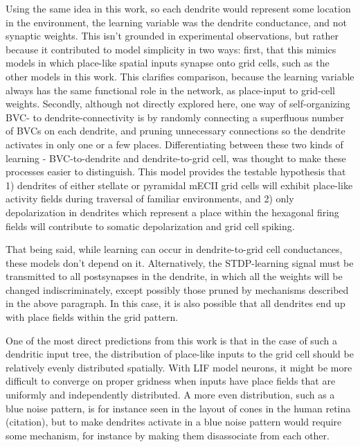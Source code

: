 \documentclass{article}
\begin{document}
    Using the same idea in this work, so each dendrite would represent some location in the environment, the learning variable was the dendrite conductance, and not synaptic weights. This isn't grounded in experimental observations, but rather because it contributed to model simplicity in two ways: first, that this mimics models in which place-like spatial inputs synapse onto grid cells, such as the other models in this work. This clarifies comparison, because the learning variable always has the same functional role in the network, as place-input to grid-cell weights. Secondly, although not directly explored here, one way of self-organizing BVC- to dendrite-connectivity is by randomly connecting a superfluous number of BVCs on each dendrite, and pruning unnecessary connections so the dendrite activates in only one or a few places. Differentiating between these two kinds of learning - BVC-to-dendrite and dendrite-to-grid cell, was thought to make these processes easier to distinguish. 
    This model provides the testable hypothesis that 1) dendrites of either stellate or pyramidal mECII grid cells will exhibit place-like activity fields during traversal of familiar environments, and 2) only depolarization in dendrites which represent a place within the hexagonal firing fields will contribute to somatic depolarization and grid cell spiking. 

    That being said, while learning can occur in dendrite-to-grid cell conductances, these models don't depend on it. Alternatively, the STDP-learning signal must be transmitted to all postsynapses in the dendrite, in which all the weights will be changed indiscriminately, except possibly those pruned by mechanisms described in the above paragraph. In this case, it is also possible that all dendrites end up with place fields within the grid pattern.

    One of the most direct predictions from this work is that in the case of such a dendritic input tree, the distribution of place-like inputs to the grid cell should be relatively evenly distributed spatially. With LIF model neurons, it might be more difficult to converge on proper gridness when inputs have place fields that are uniformly and independently distributed. A more even distribution, such as a blue noise pattern, is for instance seen in the layout of cones in the human retina (citation), but to make dendrites activate in a blue noise pattern would require some mechanism, for instance by making them disassociate from each other.
\end{document}

